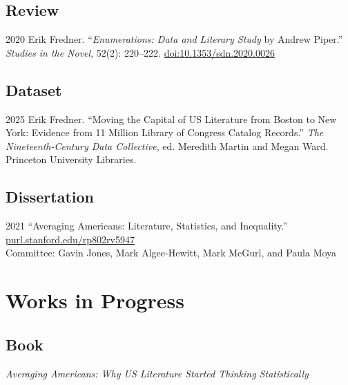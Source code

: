\documentclass[12pt,letterpaper]{report}
\begin{document}
\subsection*{Review}

\begin{tablist}
	\item[2020] \tab{}Erik Fredner. \enquote{\emph{Enumerations: Data and Literary Study} by Andrew Piper.} \textit{Studies in the Novel}, 52(2): 220--222. \href{https://doi.org/10.1353/sdn.2020.0026}{doi:10.1353/sdn.2020.0026}
\end{tablist}

\subsection*{Dataset}

\begin{tablist}
	\item[2025] \tab{}Erik Fredner. \enquote{Moving the Capital of US Literature from Boston to New York: Evidence from 11 Million Library of Congress Catalog Records.} \emph{The Nineteenth-Century Data Collective}, ed. Meredith Martin and Megan Ward. Princeton University Libraries.
\end{tablist}

\subsection*{Dissertation}

\begin{tablist}
	\item[2021] \tab{}\enquote{Averaging Americans: Literature, Statistics, and Inequality.} \href{https://purl.stanford.edu/rp802rv5947}{purl.stanford.edu/rp802rv5947}\\
	Committee: Gavin Jones, Mark Algee-Hewitt, Mark McGurl, and Paula Moya
\end{tablist}

\section*{Works in Progress}

\subsection*{Book}

\textit{Averaging Americans: Why US Literature Started Thinking Statistically}
\end{document}
